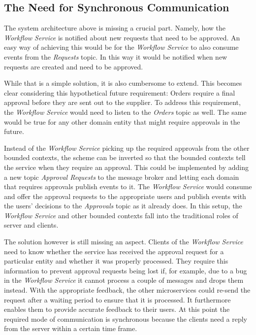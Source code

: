 \subsection{The Need for Synchronous Communication}

The system architecture above is missing a crucial part.
Namely, how the \emph{Workflow Service} is notified about new requests that need to be approved.
An easy way of achieving this would be for the \emph{Workflow Service} to also consume events from the \emph{Requests} topic.
In this way it would be notified when new requests are created and need to be approved.

While that is a simple solution, it is also cumbersome to extend.
This becomes clear considering this hypothetical future requirement: Orders require a final approval before they are sent out to the supplier.
To address this requirement, the \emph{Workflow Service} would need to listen to the \emph{Orders} topic as well.
The same would be true for any other domain entity that might require approvals in the future.

Instead of the \emph{Workflow Service} picking up the required approvals from the other bounded contexts, the scheme can be inverted so that the bounded contexts tell the service when they require an approval.
This could be implemented by adding a new topic \emph{Approval Requests} to the message broker and letting each domain that requires approvals publish events to it.
The \emph{Workflow Service} would consume and offer the approval requests to the appropriate users and publish events with the users' decisions to the \emph{Approvals} topic as it already does.
In this setup, the \emph{Workflow Service} and other bounded contexts fall into the traditional roles of server and clients.

The solution however is still missing an aspect.
Clients of the \emph{Workflow Service} need to know whether the service has received the approval request for a particular entity and whether it was properly processed.
They require this information to prevent approval requests being lost if, for example, due to a bug in the \emph{Workflow Service} it cannot process a couple of messages and drops them instead.
With the appropriate feedback, the other microservices could re-send the request after a waiting period to ensure that it is processed.
It furthermore enables them to provide accurate feedback to their users.
At this point the required mode of communication is synchronous because the clients need a reply from the server within a certain time frame.

